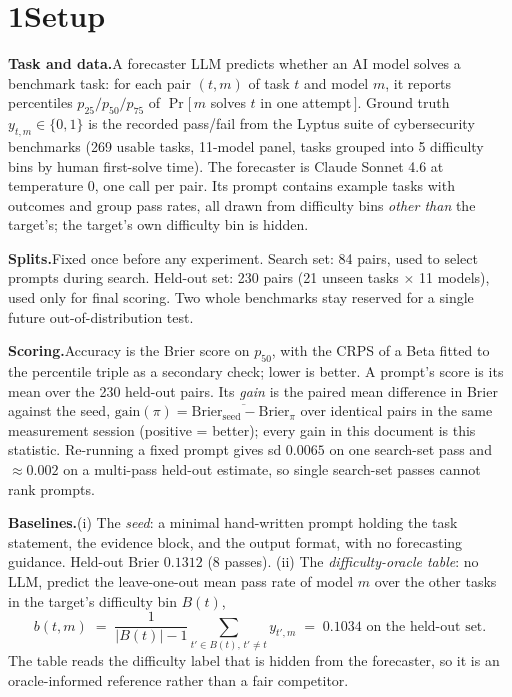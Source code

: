 \documentclass[10pt]{article}
\newcommand{\thepar}[1]{\vspace{2.5pt}\textbf{#1}\hspace{0.7em}}
\begin{document}
\section*{1\quad Setup}

\thepar{Task and data.}A forecaster LLM predicts whether an AI model solves a benchmark task: for each pair $(t,m)$ of task $t$ and model $m$, it reports percentiles $p_{25}/p_{50}/p_{75}$ of $\Pr[\,m$ solves $t$ in one attempt$\,]$. Ground truth $y_{t,m}\in\{0,1\}$ is the recorded pass/fail from the Lyptus suite of cybersecurity benchmarks (269 usable tasks, 11-model panel, tasks grouped into 5 difficulty bins by human first-solve time). The forecaster is Claude Sonnet 4.6 at temperature 0, one call per pair. Its prompt contains example tasks with outcomes and group pass rates, all drawn from difficulty bins \emph{other than} the target's; the target's own difficulty bin is hidden.

\thepar{Splits.}Fixed once before any experiment. Search set: 84 pairs, used to select prompts during search. Held-out set: 230 pairs (21 unseen tasks $\times$ 11 models), used only for final scoring. Two whole benchmarks stay reserved for a single future out-of-distribution test.

\thepar{Scoring.}Accuracy is the Brier score on $p_{50}$, with the CRPS of a Beta fitted to the percentile triple as a secondary check; lower is better. A prompt's score is its mean over the 230 held-out pairs. Its \emph{gain} is the paired mean difference in Brier against the seed, $\mathrm{gain}(\pi)=\overline{\mathrm{Brier}_{\mathrm{seed}}-\mathrm{Brier}_{\pi}}$ over identical pairs in the same measurement session (positive = better); every gain in this document is this statistic. Re-running a fixed prompt gives sd $0.0065$ on one search-set pass and $\approx0.002$ on a multi-pass held-out estimate, so single search-set passes cannot rank prompts.

\thepar{Baselines.}(i) The \emph{seed}: a minimal hand-written prompt holding the task statement, the evidence block, and the output format, with no forecasting guidance. Held-out Brier $0.1312$ (8 passes). (ii) The \emph{difficulty-oracle table}: no LLM, predict the leave-one-out mean pass rate of model $m$ over the other tasks in the target's difficulty bin $B(t)$,
\begin{equation*}
b(t,m) \;=\; \frac{1}{|B(t)|-1} \sum_{t' \in B(t),\, t' \neq t} y_{t',m}
\;=\; 0.1034 \text{ on the held-out set.}
\end{equation*}
The table reads the difficulty label that is hidden from the forecaster, so it is an oracle-informed reference rather than a fair competitor.
\end{document}
